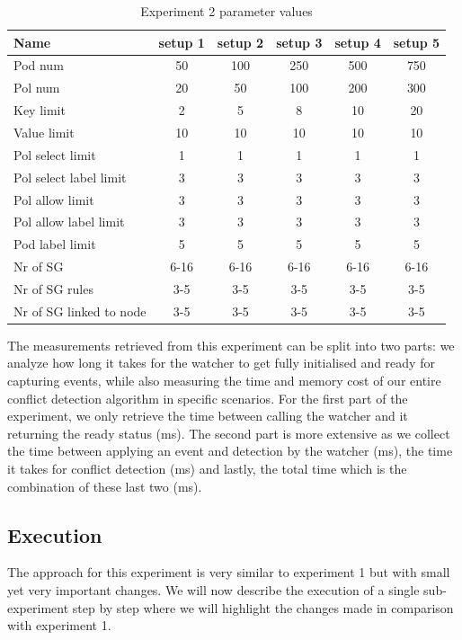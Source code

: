 \begin{table}[H]
    \centering
    \begin{tabular}{|l|c|c|c|c|c|}
        \hline
        \textbf{Name} & \textbf{setup 1} & \textbf{setup 2} & \textbf{setup 3} & \textbf{setup 4} & \textbf{setup 5}\\
        \hline
        Pod num & 50 & 100 & 250 & 500 & 750 \\
        Pol num & 20 & 50 & 100 & 200 & 300 \\
        Key limit & 2 & 5 & 8 & 10 & 20 \\
        Value limit & 10 & 10 & 10 & 10 & 10 \\
        Pol select limit & 1 & 1 & 1 & 1 & 1 \\
        Pol select label limit & 3 & 3 & 3 & 3 & 3 \\
        Pol allow limit & 3 & 3 & 3 & 3 & 3 \\
        Pol allow label limit & 3 & 3 & 3 & 3 & 3 \\
        Pod label limit & 5 & 5 & 5 & 5 & 5 \\
        Nr of SG & 6-16 & 6-16 & 6-16 & 6-16 & 6-16\\
        Nr of SG rules & 3-5 &3-5 & 3-5 & 3-5 & 3-5\\
        Nr of SG linked to node & 3-5 &3-5 & 3-5 & 3-5 & 3-5\\
	
        \hline
    \end{tabular}
    \caption{Experiment 2 parameter values}
    \label{tab:exp2pars}
\end{table}

The measurements retrieved from this experiment can be split into two parts: we analyze how long it takes for the watcher to get fully initialised and ready for capturing events, while also measuring the time and memory cost of our entire conflict detection algorithm in specific scenarios. For the first part of the experiment, we only retrieve the time between calling the watcher and it returning the ready status (ms). The second part is more extensive as we collect the time between applying an event and detection by the watcher (ms), the time it takes for conflict detection (ms) and lastly, the total time which is the combination of these last two (ms). 

\subsection{Execution} \label{exp2:execution}
The approach for this experiment is very similar to experiment 1 but with small yet very important changes.  We will now describe the execution of a single sub-experiment step by step where we will highlight the changes made in comparison with experiment 1.
\\[10pt]

